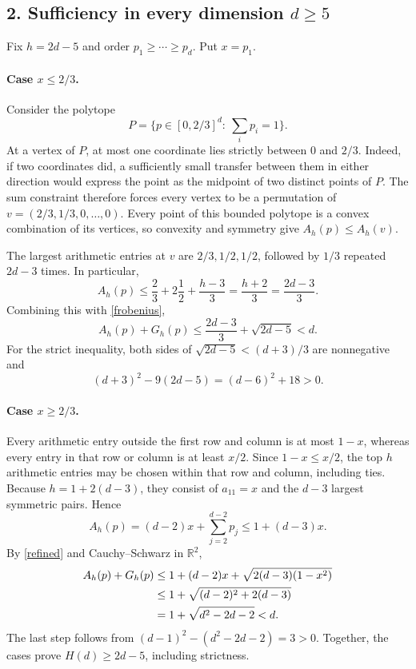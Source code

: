 \documentclass[11pt]{article}
\newcommand{\R}{\mathbb R}
\begin{document}
\subsection*{2. Sufficiency in every dimension $d\ge5$}
Fix $h=2d-5$ and order $p_1\ge\cdots\ge p_d$. Put $x=p_1$.

\paragraph{Case $x\le2/3$.}
Consider the polytope
\[
 P=\{p\in[0,2/3]^d:\ \textstyle\sum_i p_i=1\}.
\]
At a vertex of $P$, at most one coordinate lies strictly between
$0$ and $2/3$. Indeed, if two coordinates did, a sufficiently small
transfer between them in either direction would express the point
as the midpoint of two distinct points of $P$. The sum constraint
therefore forces every vertex to be a permutation of
$v=(2/3,1/3,0,\ldots,0)$.
Every point of this bounded polytope is a convex combination of
its vertices, so convexity and symmetry give $A_h(p)\le A_h(v)$.

The largest arithmetic entries at $v$ are $2/3,1/2,1/2$,
followed by $1/3$ repeated $2d-3$ times. In particular,
\[
 A_h(p)\le\frac23+2\frac12+\frac{h-3}{3}
            =\frac{h+2}{3}=\frac{2d-3}{3}.
\]
Combining this with \eqref{frobenius},
\begin{equation}\label{diffuse}
 A_h(p)+G_h(p)\le\frac{2d-3}{3}+\sqrt{2d-5}<d.
\end{equation}
For the strict inequality, both sides of
$\sqrt{2d-5}<(d+3)/3$ are nonnegative and
\[
 (d+3)^2-9(2d-5)=(d-6)^2+18>0.
\]

\paragraph{Case $x\ge2/3$.}
Every arithmetic entry outside the first row and column is at
most $1-x$, whereas every entry in that row or column is at least
$x/2$. Since $1-x\le x/2$, the top $h$ arithmetic entries may
be chosen within that row and column, including ties.
Because $h=1+2(d-3)$, they consist of $a_{11}=x$ and the
$d-3$ largest symmetric pairs. Hence
\[
 A_h(p)=(d-2)x+\sum_{j=2}^{d-2}p_j
             \le1+(d-3)x.
\]
By \eqref{refined} and Cauchy--Schwarz in $\R^2$,
\begin{align}
 A_h(p)+G_h(p)
 &\le1+(d-2)x+\sqrt{2(d-3)(1-x^2)}\notag\\
 &\le1+\sqrt{(d-2)^2+2(d-3)}\notag\\
 &=1+\sqrt{d^2-2d-2}<d.\label{concentrated}
\end{align}
The last step follows from $(d-1)^2-(d^2-2d-2)=3>0$.
Together, the cases prove $H(d)\ge2d-5$, including strictness.
\end{document}
